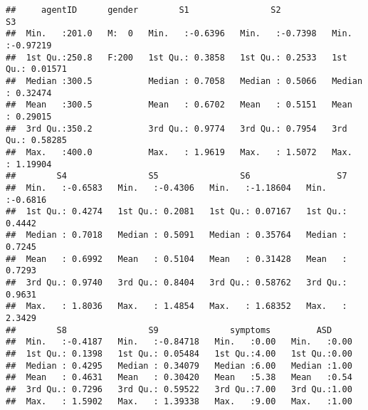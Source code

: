 \documentclass[]{article}
\newenvironment{Shaded}{\begin{snugshade}}{\end{snugshade}}
\newcommand{\KeywordTok}[1]{\textcolor[rgb]{0.13,0.29,0.53}{\textbf{#1}}}
\newcommand{\DecValTok}[1]{\textcolor[rgb]{0.00,0.00,0.81}{#1}}
\newcommand{\StringTok}[1]{\textcolor[rgb]{0.31,0.60,0.02}{#1}}
\newcommand{\CommentTok}[1]{\textcolor[rgb]{0.56,0.35,0.01}{\textit{#1}}}
\newcommand{\OperatorTok}[1]{\textcolor[rgb]{0.81,0.36,0.00}{\textbf{#1}}}
\newcommand{\NormalTok}[1]{#1}
\begin{document}
\begin{verbatim}
##     agentID      gender        S1                S2                S3          
##  Min.   :201.0   M:  0   Min.   :-0.6396   Min.   :-0.7398   Min.   :-0.97219  
##  1st Qu.:250.8   F:200   1st Qu.: 0.3858   1st Qu.: 0.2533   1st Qu.: 0.01571  
##  Median :300.5           Median : 0.7058   Median : 0.5066   Median : 0.32474  
##  Mean   :300.5           Mean   : 0.6702   Mean   : 0.5151   Mean   : 0.29015  
##  3rd Qu.:350.2           3rd Qu.: 0.9774   3rd Qu.: 0.7954   3rd Qu.: 0.58285  
##  Max.   :400.0           Max.   : 1.9619   Max.   : 1.5072   Max.   : 1.19904  
##        S4                S5                S6                 S7         
##  Min.   :-0.6583   Min.   :-0.4306   Min.   :-1.18604   Min.   :-0.6816  
##  1st Qu.: 0.4274   1st Qu.: 0.2081   1st Qu.: 0.07167   1st Qu.: 0.4442  
##  Median : 0.7018   Median : 0.5091   Median : 0.35764   Median : 0.7245  
##  Mean   : 0.6992   Mean   : 0.5104   Mean   : 0.31428   Mean   : 0.7293  
##  3rd Qu.: 0.9740   3rd Qu.: 0.8404   3rd Qu.: 0.58762   3rd Qu.: 0.9631  
##  Max.   : 1.8036   Max.   : 1.4854   Max.   : 1.68352   Max.   : 2.3429  
##        S8                S9              symptoms         ASD      
##  Min.   :-0.4187   Min.   :-0.84718   Min.   :0.00   Min.   :0.00  
##  1st Qu.: 0.1398   1st Qu.: 0.05484   1st Qu.:4.00   1st Qu.:0.00  
##  Median : 0.4295   Median : 0.34079   Median :6.00   Median :1.00  
##  Mean   : 0.4631   Mean   : 0.30420   Mean   :5.38   Mean   :0.54  
##  3rd Qu.: 0.7296   3rd Qu.: 0.59522   3rd Qu.:7.00   3rd Qu.:1.00  
##  Max.   : 1.5902   Max.   : 1.39338   Max.   :9.00   Max.   :1.00
\end{verbatim}

\begin{Shaded}
\end{Shaded}
\end{document}
